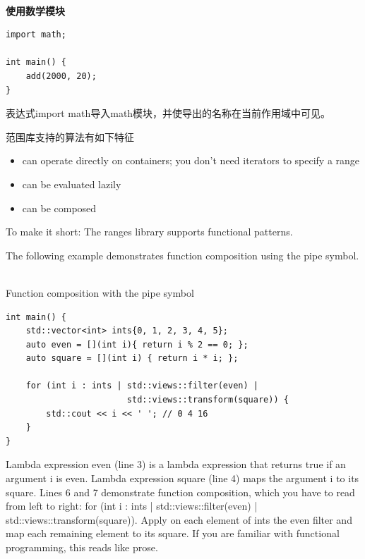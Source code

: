 \hspace*{\fill} \\ %
\noindent
\textbf{使用数学模块}
\begin{lstlisting}[style=styleCXX]
import math;

int main() {
	add(2000, 20);
}
\end{lstlisting}

表达式import math导入math模块，并使导出的名称在当前作用域中可见。


范围库支持的算法有如下特征

\begin{itemize}
\item 
can operate directly on containers; you don’t need iterators to specify a range

\item 
can be evaluated lazily

\item 
can be composed
\end{itemize}

To make it short: The ranges library supports functional patterns.

The following example demonstrates function composition using the pipe symbol.

\hspace*{\fill} \\ %
\noindent
Function composition with the pipe symbol
\begin{lstlisting}[style=styleCXX]
int main() {
	std::vector<int> ints{0, 1, 2, 3, 4, 5};
	auto even = [](int i){ return i % 2 == 0; };
	auto square = [](int i) { return i * i; };
	
	for (int i : ints | std::views::filter(even) |
						std::views::transform(square)) {
		std::cout << i << ' '; // 0 4 16
	}
}
\end{lstlisting}

Lambda expression even (line 3) is a lambda expression that returns true if an argument i is even. Lambda expression square (line 4) maps the argument i to its square. Lines 6 and 7 demonstrate function composition, which you have to read from left to right: for (int i : ints | std::views::filter(even) | std::views::transform(square)). Apply on each element of ints the even filter and map each remaining element to its square. If you are familiar with functional programming, this reads like prose.

